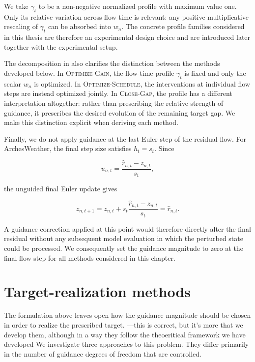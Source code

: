 We take \(\gamma_t\) to be a non-negative normalized profile with maximum
value one. Only its relative variation across flow time is relevant: any
positive multiplicative rescaling of \(\gamma_t\) can be absorbed into
\(w_n\). The concrete profile families considered in this thesis are therefore
an experimental design choice and are introduced later together with the
experimental setup.

The decomposition in  also clarifies
the distinction between the methods developed below. In
\textsc{Optimize-Gain}, the flow-time profile \(\gamma_t\) is fixed and only
the scalar \(w_n\) is optimized. In \textsc{Optimize-Schedule}, the
interventions at individual flow steps are instead optimized jointly. In
\textsc{Close-Gap}, the profile has a different interpretation altogether:
rather than prescribing the relative strength of guidance, it prescribes the
desired evolution of the remaining target gap. We make this distinction
explicit when deriving each method.

Finally, we do not apply guidance at the last Euler step of the residual flow.
For ArchesWeather, the final step size satisfies \(h_t=s_t\). Since

\begin{equation}
    u_{n,t}
    =
    \frac{\hat r_{n,t}-z_{n,t}}{s_t},
\end{equation}

the unguided final Euler update gives

\begin{equation}
    z_{n,t+1}
    =
    z_{n,t}
    +
    s_t
    \frac{\hat r_{n,t}-z_{n,t}}{s_t}
    =
    \hat r_{n,t}.
    \label{eq:final-flow-snap}
\end{equation}

A guidance correction applied at this point would therefore directly alter
the final residual without any subsequent model evaluation in which the
perturbed state could be processed. We consequently set the guidance
magnitude to zero at the final flow step for all methods considered in this
chapter.

\section{Target-realization methods}
\label{sec:target-realization-methods}

The formulation above leaves open how the guidance magnitude should be chosen
in order to realize the prescribed target. 
---this is correct, but it's more that we develop them, although in a way they follow the theoeritical framework we have developed
We investigate three approaches to
this problem. They differ primarily in the number of guidance degrees of
freedom that are controlled.

